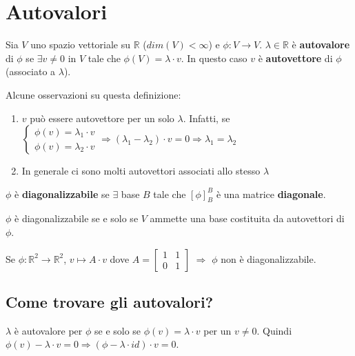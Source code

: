 \newpage
\section{Autovalori}
\begin{definition}[Autovalori]
	Sia $V$ uno spazio vettoriale su $\mathbb{R}$ ($dim(V) < \infty$) e $\phi: V \to V$. $\lambda \in \mathbb{R}$ è \textbf{autovalore} di $\phi$ se $\exists v \neq 0$ in $V$ tale che $\phi(V) = \lambda \cdot v$. In questo caso $v$ è \textbf{autovettore} di $\phi$ (associato a $\lambda$).
\end{definition}
\begin{observation}
	Alcune osservazioni su questa definizione:
	\begin{enumerate}
		\item $v$ può essere autovettore per un solo $\lambda$. Infatti, se $\begin{cases}
			\phi(v)=\lambda_{1} \cdot v \\
			\phi(v)=\lambda_{2} \cdot v
		\end{cases} \Longrightarrow (\lambda_{1} - \lambda_{2}) \cdot v = 0 \Longrightarrow \lambda_{1} = \lambda_{2}$
		\item In generale ci sono molti autovettori associati allo stesso $\lambda$
	\end{enumerate}
\end{observation}

\begin{definition}[Diagonalizzabile]
	$\phi$ è \textbf{diagonalizzabile} se $\exists$ base $B$ tale che $[\phi]^B_B$ è una matrice \textbf{diagonale}.
\end{definition}

\begin{proposition}
	$\phi$ è diagonalizzabile se e solo se $V$ ammette una base costituita da autovettori di $\phi$. \\
\end{proposition}

\begin{example}
	Se $\phi: \mathbb{R}^2 \to \mathbb{R}^2$, $v \mapsto A \cdot v$  dove $A = \begin{bmatrix}
		1 & 1 \\
		0  &1
	\end{bmatrix}$ $\Longrightarrow$ $\phi$ non è diagonalizzabile.  
\end{example}

\subsection{Come trovare gli autovalori?}
$\lambda$ è autovalore per $\phi$ se e solo se $\phi(v) = \lambda \cdot v$ per un $v \neq 0$. Quindi $\phi(v) - \lambda \cdot v = 0 \Longrightarrow (\phi - \lambda \cdot id) \cdot v = 0$.
